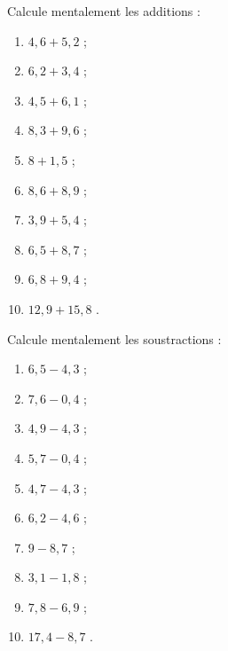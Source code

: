 

\begin{exercice}
Calcule mentalement les additions :
\begin{enumerate} 
 \item $4,6 + 5,2$ \dotfill ; 
 
 \item $6,2 + 3,4$ \dotfill ; 
 
 \item $4,5 + 6,1$ \dotfill ; 
 
 \item $8,3 + 9,6$ \dotfill ; 
 
 \item $8 + 1,5$ \dotfill ; 
 
 \item $8,6 + 8,9$ \dotfill ; 
 
 \item $3,9 + 5,4$ \dotfill ; 
 
 \item $6,5 + 8,7$ \dotfill ; 
 
 \item $6,8 + 9,4$ \dotfill ; 
 
 \item \hspace{0.1em} $12,9 + 15,8$ \dotfill. 

 \end{enumerate}
\end{exercice}


\begin{exercice}
Calcule mentalement les soustractions :
\begin{enumerate} 
 \item $6,5 - 4,3$ \dotfill ; 
 
 \item $7,6 - 0,4$ \dotfill ; 
 
 \item $4,9 - 4,3$ \dotfill ; 
 
 \item $5,7 - 0,4$ \dotfill ; 
 
 \item $4,7 - 4,3$ \dotfill ; 
 
 \item $6,2 - 4,6$ \dotfill ; 
 
 \item $9 - 8,7$ \dotfill ; 
 
 \item $3,1 - 1,8$ \dotfill ; 
 
 \item $7,8 - 6,9$ \dotfill ; 
 
 \item \hspace{0.2em}$17,4 - 8,7$ \dotfill. 
 
 \end{enumerate}  
\end{exercice}


